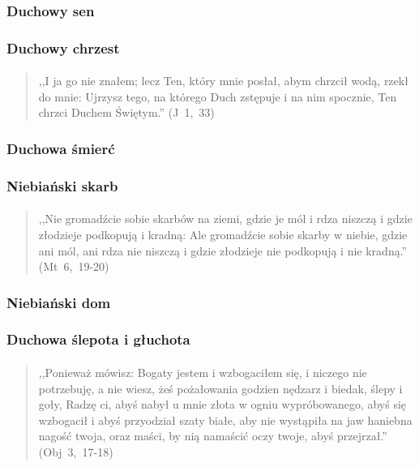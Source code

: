 \documentclass[10pt,a4paper,oneside]{article}
\begin{document}
\subsubsection{Duchowy sen}
\subsubsection{Duchowy chrzest}
\paragraph{}
\begin{quote}
,,I ja go nie znałem; lecz Ten, który mnie posłał, abym chrzcił wodą, rzekł do mnie: Ujrzysz tego, na którego Duch zstępuje i na nim spocznie, Ten chrzci Duchem Świętym.'' \mbox{(J 1, 33)}
\end{quote}
\subsubsection{Duchowa śmierć}
\subsubsection{Niebiański skarb}
\paragraph{}
\begin{quote}
,,Nie gromadźcie sobie skarbów na ziemi, gdzie je mól i rdza niszczą i gdzie złodzieje podkopują i kradną: Ale gromadźcie sobie skarby w niebie, gdzie ani mól, ani rdza nie niszczą i gdzie złodzieje nie podkopują i nie kradną.'' \mbox{(Mt 6, 19-20)}
\end{quote}
\subsubsection{Niebiański dom}
\subsubsection{Duchowa ślepota i głuchota}
\paragraph{}
\begin{quote}
,,Ponieważ mówisz: Bogaty jestem i wzbogaciłem się, i niczego nie potrzebuję, a nie wiesz, żeś pożałowania godzien nędzarz i biedak, ślepy i goły, Radzę ci, abyś nabył u mnie złota w ogniu wypróbowanego, abyś się wzbogacił i abyś przyodział szaty białe, aby nie wystąpiła na jaw haniebna nagość twoja, oraz maści, by nią namaścić oczy twoje, abyś przejrzał.'' \mbox{(Obj 3, 17-18)}
\end{quote}
\end{document}
